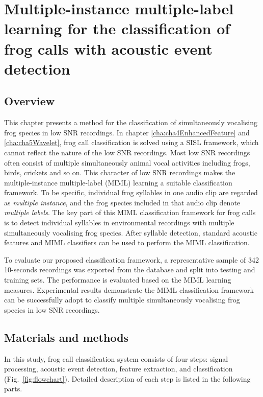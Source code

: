 
\chapter{Multiple-instance multiple-label learning for the classification of frog calls with acoustic event detection}
\label{cha:cha6MIML}


\section{Overview}
\label{sec:intro}

This chapter presents a method for the classification of simultaneously vocalising frog species in low SNR recordings. In chapter \ref{cha:cha4EnhancedFeature} and \ref{cha:cha5Wavelet}, frog call classification is solved using a SISL framework, which cannot reflect the nature of the low SNR recordings. Most low SNR recordings often consist of multiple simultaneously animal vocal activities including frogs, birds, crickets and so on. This character of low SNR recordings makes the multiple-instance multiple-label (MIML) learning a suitable classification framework. To be specific, individual frog syllables in one audio clip are regarded as \textit{multiple instance}, and the frog species included in that audio clip denote \textit{multiple labels}. 
The key part of this MIML classification framework for frog calls is to detect individual syllables in environmental recordings with multiple simultaneously vocalising frog species. After syllable detection, standard acoustic features and MIML classifiers can be used to perform the MIML classification.


To evaluate our proposed classification framework, a representative sample of 342 10-seconds recordings was exported from the database and split into testing and training sets. The performance is evaluated based on the MIML learning measures. Experimental results demonstrate the MIML classification framework can be successfully adopt to classify multiple simultaneously vocalising frog species in low SNR recordings.



\section{Materials and methods}
In this study, frog call classification system consists of
four steps: signal processing, acoustic event detection, feature
extraction, and classification (Fig.~\ref{fig:flowchart}). Detailed description of each step is listed in the following parts. 

